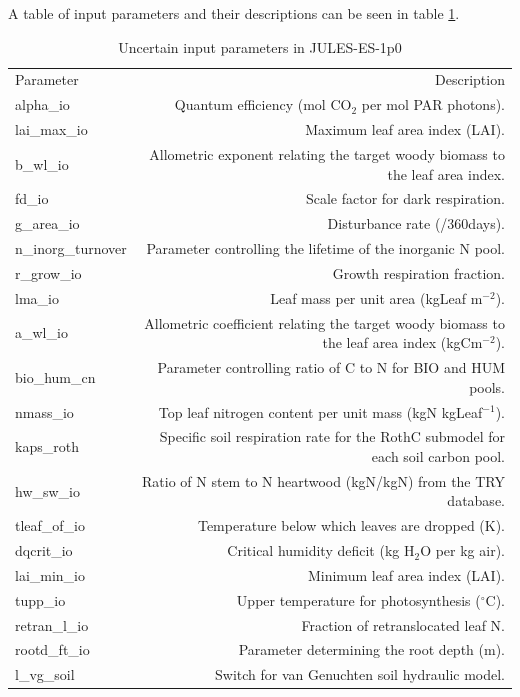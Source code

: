 \documentclass[gmd, manuscript]{copernicus}
\begin{document}
A table of input parameters and their descriptions can be seen in table \ref{table:Parameters}.
\begin{table}[ht]
\caption{Uncertain input parameters in JULES-ES-1p0}
\label{table:Parameters}
\begin{tabular}{l r}
\tophline
Parameter & Description  \\ 
\middlehline

alpha\_io & Quantum efficiency (mol CO$_2$ per mol PAR photons). \\ 
  lai\_max\_io & Maximum leaf area index (LAI). \\ 
  b\_wl\_io & Allometric exponent relating the target woody biomass to the leaf area index.\\ 
  fd\_io & Scale factor for dark respiration.\\ 
  g\_area\_io &  Disturbance rate (/360days).\\ 
  n\_inorg\_turnover & Parameter controlling the lifetime of the inorganic N pool. \\ 
  r\_grow\_io & Growth respiration fraction.\\ 
  lma\_io & Leaf mass per unit area (kgLeaf m$^{-2}$). \\ 
  a\_wl\_io & Allometric coefficient relating the target woody biomass to the leaf area index (kgCm$^{-2}$). \\ 
  bio\_hum\_cn &  Parameter controlling ratio of C to N for BIO and HUM pools.\\ 
  nmass\_io &  Top leaf nitrogen content per unit mass (kgN kgLeaf$^{-1}$).\\ 
  kaps\_roth &  Specific soil respiration rate for the RothC submodel for each soil carbon pool.\\ 
  hw\_sw\_io & Ratio of N stem to N heartwood (kgN/kgN) from the TRY database. \\ 
  tleaf\_of\_io & Temperature below which leaves are dropped (K).\\ 
  dqcrit\_io & Critical humidity deficit (kg H$_2$O per kg air). \\ 
  lai\_min\_io & Minimum leaf area index (LAI). \\ 
  tupp\_io & Upper temperature for photosynthesis ($^\circ$C). \\ 
  retran\_l\_io & Fraction of retranslocated leaf N.\\ 
  rootd\_ft\_io & Parameter determining the root depth (m). \\ 
  l\_vg\_soil & Switch for van Genuchten soil hydraulic model. \\ 

\end{tabular}
\end{table}
\end{document}
